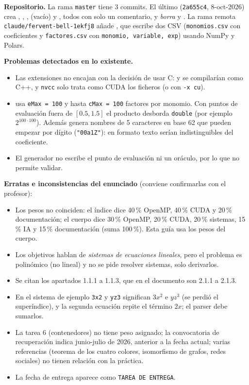 \textbf{Repositorio.} La rama \texttt{master} tiene 3 commits. El último (\texttt{2a655c4}, 8-oct-2026) crea , , ,  (vacío) y , todos con solo un comentario, y \emph{borra}  y . La rama remota \texttt{claude/fervent-bell-1ekfj8} añade , que escribe dos CSV (\texttt{monomios.csv} con coeficientes y \texttt{factores.csv} con \texttt{monomio, variable, exp}) usando NumPy y Polars.

\textbf{Problemas detectados en lo existente.}
\begin{itemize}
\item Las extensiones no encajan con la decisión de usar C:  y  se compilarían como C++, y \texttt{nvcc} solo trata como CUDA los ficheros  (o con \texttt{-x cu}).
\item {} usa \texttt{eMax = 100} y hasta \texttt{cMax = 100} factores por monomio. Con puntos de evaluación fuera de $[0.5, 1.5]$ el producto desborda \texttt{double} (por ejemplo $2^{100\cdot 100}$). Además genera nombres de 5 caracteres en base 62 que pueden empezar por dígito (\texttt{"00a1Z"}): en formato texto serían indistinguibles del coeficiente.
\item El generador no escribe el punto de evaluación ni un oráculo, por lo que no permite validar.
\end{itemize}

\textbf{Erratas e inconsistencias del enunciado} (conviene confirmarlas con el profesor):
\begin{itemize}
\item Los pesos no coinciden: el índice dice 40\,\% OpenMP, 40\,\% CUDA y 20\,\% documentación; el cuerpo dice 30\,\% OpenMP, 20\,\% CUDA, 20\,\% sistemas, 15\,\% IA y 15\,\% documentación (suma 100\,\%). Esta guía usa los pesos del cuerpo.
\item Los objetivos hablan de \emph{sistemas de ecuaciones lineales}, pero el problema es polinómico (no lineal) y no se pide resolver sistemas, solo derivarlos.
\item Se citan los apartados 1.1.1 a 1.1.3, que en el documento son 2.1.1 a 2.1.3.
\item En el sistema de ejemplo \texttt{3x2} y \texttt{yz3} significan $3x^2$ e $yz^3$ (se perdió el superíndice), y la segunda ecuación repite el término $2x$; el parser debe sumarlos.
\item La tarea 6 (contenedores) no tiene peso asignado; la convocatoria de recuperación indica junio-julio de 2026, anterior a la fecha actual; varias referencias (teorema de los cuatro colores, isomorfismo de grafos, redes sociales) no tienen relación con la práctica.
\item La fecha de entrega aparece como \texttt{TAREA DE ENTREGA}. 
\end{itemize}

